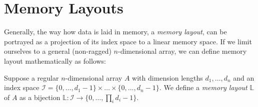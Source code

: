 \section{Memory Layouts}





Generally, the way how data is laid in memory, a \emph{memory layout}, can be portrayed as a projection of its index space to a linear memory space. If we limit ourselves to a general (non-ragged) $n$-dimensional array, we can define memory layout mathematically as follows:

\begin{defn}
  Suppose a regular $n$-dimensional array $A$ with dimension lengths $d_1, \dots, d_n$ and an index space $\mathcal{I} = \{0,\dots,d_1 - 1\}\times \dots \times \{0,\dots,d_n - 1\}$. We define a \emph{memory layout} $\mathbb{L}$ of $A$ as a bijection $\mathbb{L}: \mathcal{I} \to \{0,\dots, \prod_{i}d_i - 1\}$. 
\end{defn}

